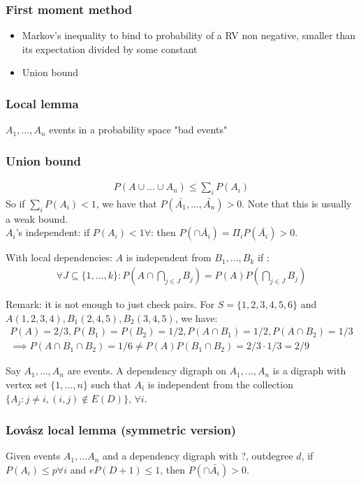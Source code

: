 \documentclass[11pt]{book}
\begin{document}
\subsubsection{First moment method} 
\begin{itemize}
	\item Markov's inequality to bind to probability of a RV non negative, smaller than its expectation divided by some constant
	\item Union bound	
\end{itemize}


\subsubsection{Local lemma}
$A_1, ..., A_n$ events in a probability space "bad events"
\subsubsection{Union bound}
\begin{eqnarray}
	P(A \cup ... \cup A_n) \leq \sum_i P(A_i)
\end{eqnarray}
So if $\sum_i P(A_i) < 1$, we have that $P(\bar{A_1}, ..., \bar{A_n}) > 0$. Note that this is usually a weak bound.\\

$A_i$'s independent: if $P(A_i) < 1 \forall$: then $P(\cap \bar{A_i}) = \Pi_i P(\bar{A_i}) > 0$.

With local dependencies: $A$ is independent from $B_1, ..., B_k$ if :
\begin{eqnarray}
	\forall J \subseteq \{1,...,k\} : P(A \cap \bigcap_{j \in J} B_j) = P(A) P(\bigcap_{j \in J}B_j)
\end{eqnarray}

Remark: it is not enough to just check pairs. For $S = \{1,2,3,4,5,6\}$ and $A(1,2,3,4), B_1(2,4,5), B_2(3,4,5)$, we have:
\begin{eqnarray}
	P(A) = 2/3, P(B_1) = P(B_2) = 1/2, P(A \cap B_1) = 1/2, P(A \cap B_2) = 1/3\\
	\implies P(A \cap B_1 \cap B_2) = 1/6 \neq P(A) P(B_1 \cap B_2) = 2/3 \cdot 1/3 = 2/9 
\end{eqnarray}

Say $A_1, ..., A_n$ are events. A dependency digraph on $A_1, ..., A_n$ is a digraph with vertex set $\{ 1, ..., n \}$ such that $A_i$ is independent from the collection $\{ A_j : j \neq i, (i,j) \notin E(D) \}$, $\forall i$.

\subsubsection{Lovász local lemma (symmetric version)}
Given events $A_1,...A_n$ and a dependency digraph with ?, outdegree $d$, if $P(A_i) \leq p \forall i$ and $eP(D+1) \leq 1$, then $P(\cap \bar{A_i}) > 0$.
\end{document}
